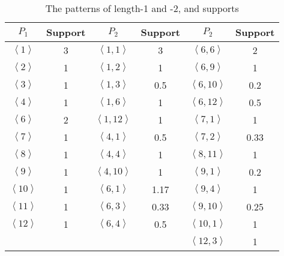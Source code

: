 \documentclass[final,authoryear,5p,times,twocolumn]{elsarticle}
\begin{document}
\begin{table}[h]
\begin{center}
    \begin{tabular}{|cc|cccc|}
    \hline
    $P_1$                              & Support & $P_2$                                & Support & $P_2$                                   & Support \\ \hline
    $\left \langle 1 \right \rangle $  & 3       & $\left \langle 1, 1 \right \rangle  $  & 3       & $\left \langle 6, 6 \right \rangle $  & 2       \\
    $\left \langle 2 \right \rangle $  & 1       & $\left \langle 1, 2 \right \rangle  $  & 1       & $\left \langle 6, 9 \right \rangle $  & 1       \\
    $\left \langle 3 \right \rangle $  & 1       & $\left \langle 1, 3 \right \rangle  $  & 0.5     & $\left \langle 6, 10 \right \rangle $ & 0.2     \\
    $\left \langle 4 \right \rangle $  & 1       & $\left \langle 1, 6 \right \rangle  $  & 1       & $\left \langle 6, 12 \right \rangle $ & 0.5     \\
    $\left \langle 6 \right \rangle $  & 2       & $\left \langle 1, 12 \right \rangle $  & 1       & $\left \langle 7, 1 \right \rangle $  & 1       \\
    $\left \langle 7 \right \rangle $  & 1       & $\left \langle 4, 1 \right \rangle  $  & 0.5     & $\left \langle 7, 2 \right \rangle $  & 0.33    \\
    $\left \langle 8 \right \rangle $  & 1       & $\left \langle 4, 4 \right \rangle  $  & 1       & $\left \langle 8, 11 \right \rangle $ & 1       \\
    $\left \langle 9 \right \rangle $  & 1       & $\left \langle 4, 10 \right \rangle $  & 1       & $\left \langle 9, 1 \right \rangle $  & 0.2     \\
    $\left \langle 10 \right \rangle $ & 1       & $\left \langle 6, 1 \right \rangle  $  & 1.17    & $\left \langle 9, 4 \right \rangle $  & 1       \\
    $\left \langle 11 \right \rangle $ & 1       & $\left \langle 6, 3 \right \rangle  $  & 0.33    & $\left \langle 9, 10 \right \rangle $ & 0.25    \\
    $\left \langle 12 \right \rangle $ & 1       & $\left \langle 6, 4 \right \rangle  $  & 0.5     & $\left \langle 10, 1 \right \rangle $ & 1       \\
    ~                                    & ~       & ~                                      & ~     & $\left \langle 12, 3 \right \rangle $ & 1       \\ \hline
    \end{tabular}
    \caption {The patterns of length-1 and -2, and supports}
    \label{tab:support}
\end{center}
\end{table}
\end{document}
